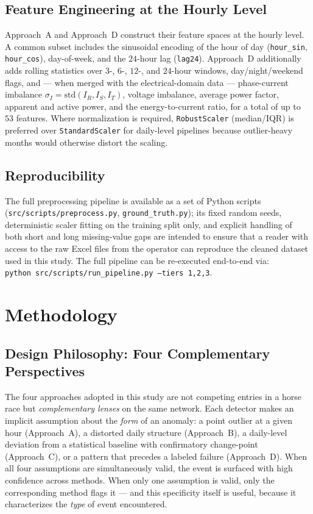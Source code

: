 \documentclass[11pt]{article}
\begin{document}
\subsection{Feature Engineering at the Hourly Level}
Approach~A and Approach~D construct their feature spaces at the hourly level. A common subset includes the sinusoidal encoding of the hour of day (\texttt{hour\_sin}, \texttt{hour\_cos}), day-of-week, and the $24$-hour lag (\texttt{lag24}). Approach~D additionally adds rolling statistics over $3$-, $6$-, $12$-, and $24$-hour windows, day/night/weekend flags, and --- when merged with the electrical-domain data --- phase-current imbalance $\sigma_I = \mathrm{std}(I_R, I_S, I_T)$, voltage imbalance, average power factor, apparent and active power, and the energy-to-current ratio, for a total of up to $53$ features. Where normalization is required, \texttt{RobustScaler} (median/IQR) is preferred over \texttt{StandardScaler} for daily-level pipelines because outlier-heavy months would otherwise distort the scaling.

\subsection{Reproducibility}
The full preprocessing pipeline is available as a set of Python scripts (\texttt{src/scripts/preprocess.py}, \texttt{ground\_truth.py}); its fixed random seeds, deterministic scaler fitting on the training split only, and explicit handling of both short and long missing-value gaps are intended to ensure that a reader with access to the raw Excel files from the operator can reproduce the cleaned dataset used in this study. The full pipeline can be re-executed end-to-end via:\\
\texttt{python src/scripts/run\_pipeline.py --tiers 1,2,3}.

\section{Methodology}\label{sec:methodology}

\subsection{Design Philosophy: Four Complementary Perspectives}
\label{subsec:design}

The four approaches adopted in this study are not competing entries in a horse race but \emph{complementary lenses} on the same network. Each detector makes an implicit assumption about the \emph{form} of an anomaly: a point outlier at a given hour (Approach~A), a distorted daily structure (Approach~B), a daily-level deviation from a statistical baseline with confirmatory change-point (Approach~C), or a pattern that precedes a labeled failure (Approach~D). When all four assumptions are simultaneously valid, the event is surfaced with high confidence across methods. When only one assumption is valid, only the corresponding method flags it --- and this specificity itself is useful, because it characterizes the \emph{type} of event encountered.
\end{document}
